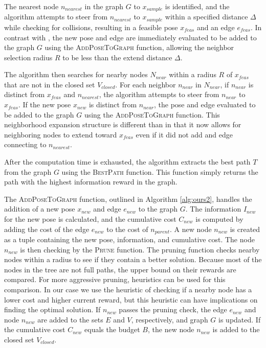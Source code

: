 The nearest node $n_{nearest}$ in the graph $G$ to $x_{sample}$ is identified, and the algorithm attempts to steer from $n_{nearest}$ to $x_{sample}$ within a specified distance $\Delta$ while checking for collisions, resulting in a feasible pose $x_{feas}$ and an edge $e_{feas}$. In contrast with \cite{moon2022tigris}, the new pose and edge are immediately evaluated to be added to the graph $G$ using the \textsc{AddPoseToGraph} function, allowing the neighbor selection radius $R$ to be less than the extend distance $\Delta$.


The algorithm then searches for nearby nodes $N_{near}$ within a radius $R$ of $x_{feas}$ that are not in the closed set $V_{closed}$. For each neighbor $n_{near}$ in $N_{near}$, if $n_{near}$ is distinct from $x_{feas}$ and $n_{nearest}$, the algorithm attempts to steer from $n_{near}$ to $x_{feas}$. If the new pose $x_{new}$ is distinct from $n_{near}$, the pose and edge evaluated to be added to the graph $G$ using the \textsc{AddPoseToGraph} function. This neighborhood expansion structure is different than \cite{moon2022tigris} in that it now allows for neighboring nodes to extend toward $x_{feas}$ even if it did not add and edge connecting to $n_{nearest}$. 

After the computation time is exhausted, the algorithm extracts the best path $T$ from the graph $G$ using the \textsc{BestPath} function. This function simply returns the path with the highest information reward in the graph. 

The \textsc{AddPoseToGraph} function, outlined in Algorithm \ref{alg:ours2}, handles the addition of a new pose $x_{new}$ and edge $e_{new}$ to the graph $G$. The information $I_{new}$ for the new pose is calculated, and the cumulative cost $C_{new}$ is computed by adding the cost of the edge $e_{new}$ to the cost of $n_{parent}$. A new node $n_{new}$ is created as a tuple containing the new pose, information, and cumulative cost. The node $n_{new}$ is then checking by the \textsc{Prune} function. The pruning function checks nearby nodes within a radius to see if they contain a better solution. Because most of the nodes in the tree are not full paths, the upper bound on their rewards are compared. For more aggressive pruning, heuristics can be used for this comparison. In our case we use the heuristic of checking if a nearby node has a lower cost and higher current reward, but this heuristic can have implications on finding the optimal solution. If $n_{new}$ passes the pruning check, the edge $e_{new}$ and node $n_{new}$ are added to the sets $E$ and $V$, respectively, and graph $G$ is updated. If the cumulative cost $C_{new}$ equals the budget $B$, the new node $n_{new}$ is added to the closed set $V_{closed}$.


